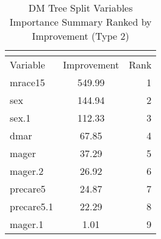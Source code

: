 \begingroup\small\setlength{\tabcolsep}{0.5em}\renewcommand{\arraystretch}{0.9}
\begin{longtable}{lcr}
\caption{DM Tree Split Variables Importance Summary Ranked by Improvement (Type 2)}\\
\label{tab:var_imp_summary_type2_multipage}\\
\hline
Variable & Improvement & Rank \\ \hline
\endhead
mrace15 & 549.99 & 1 \\
sex & 144.94 & 2 \\
sex.1 & 112.33 & 3 \\
dmar & 67.85 & 4 \\
mager & 37.29 & 5 \\
mager.2 & 26.92 & 6 \\
precare5 & 24.87 & 7 \\
precare5.1 & 22.29 & 8 \\
mager.1 & 1.01 & 9 \\
\hline
\end{longtable}
\endgroup
